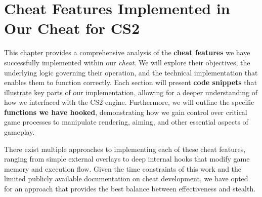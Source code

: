 \chapter{Cheat Features Implemented in Our Cheat for CS2}

This chapter provides a comprehensive analysis of the \textbf{cheat features} we have successfully implemented within our \textit{cheat}. We will explore their objectives, the underlying logic governing their operation, and the technical implementation that enables them to function correctly. Each section will present \textbf{code snippets} that illustrate key parts of our implementation, allowing for a deeper understanding of how we interfaced with the CS2 engine. Furthermore, we will outline the specific \textbf{functions we have hooked}, demonstrating how we gain control over critical game processes to manipulate rendering, aiming, and other essential aspects of gameplay.


\begin{table}[h]
    \centering
    \renewcommand{\arraystretch}{1.3} %
    \setlength{\tabcolsep}{6pt} %
    \caption{Core Functionalities Overview}
    \label{tab:core_functionalities}
\end{table}






There exist multiple approaches to implementing each of these cheat features, ranging from simple external overlays to deep internal hooks that modify game memory and execution flow. Given the time constraints of this work and the limited publicly available documentation on cheat development, we have opted for an approach that provides the best balance between effectiveness and stealth. 

